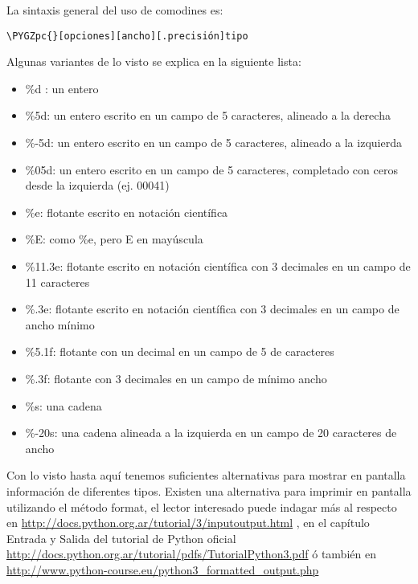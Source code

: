 \documentclass[a4paper,12pt,spanish]{sphinxmanual}
\def\PYGZpc{\char`\%}
\begin{document}
La sintaxis general del uso de comodines es:

\begin{Verbatim}[commandchars=\\\{\}]
\PYGZpc{}[opciones][ancho][.precisión]tipo
\end{Verbatim}

Algunas variantes de lo visto se explica en la siguiente lista:
\begin{itemize}
\item {} 
\%d : un entero

\item {} 
\%5d: un entero escrito en un campo de 5 caracteres, alineado a la
derecha

\item {} 
\%-5d: un entero escrito en un campo de 5 caracteres, alineado a la
izquierda

\item {} 
\%05d: un entero escrito en un campo de 5 caracteres, completado con
ceros desde la izquierda (ej. 00041)

\item {} 
\%e: flotante escrito en notación científica

\item {} 
\%E: como \%e, pero E en mayúscula

\item {} 
\%11.3e: flotante escrito en notación científica con 3 decimales en un
campo de 11 caracteres

\item {} 
\%.3e: flotante escrito en notación científica con 3 decimales en un
campo de ancho mínimo

\item {} 
\%5.1f: flotante con un decimal en un campo de 5 de caracteres

\item {} 
\%.3f: flotante con 3 decimales en un campo de mínimo ancho

\item {} 
\%s: una cadena

\item {} 
\%-20s: una cadena alineada a la izquierda en un campo de 20
caracteres de ancho

\end{itemize}

Con lo visto hasta aquí tenemos suficientes alternativas para mostrar en
pantalla información de diferentes tipos. Existen una alternativa para
imprimir en pantalla utilizando el método format, el lector interesado
puede indagar más al respecto en
\href{http://docs.python.org.ar/tutorial/3/inputoutput.html}{http://docs.python.org.ar/tutorial/3/inputoutput.html} , en el capítulo
Entrada y Salida del tutorial de Python oficial
\href{http://docs.python.org.ar/tutorial/pdfs/TutorialPython3.pdf}{http://docs.python.org.ar/tutorial/pdfs/TutorialPython3.pdf} ó también en
\href{http://www.python-course.eu/python3\_formatted\_output.php}{http://www.python-course.eu/python3\_formatted\_output.php}
\end{document}
